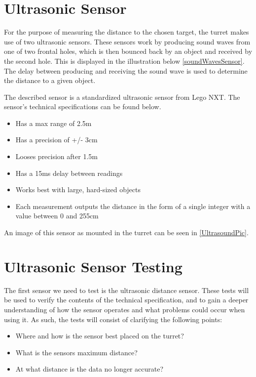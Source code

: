 \section{Ultrasonic Sensor}\label{SensTheoUltra}
For the purpose of measuring the distance to the chosen target, the turret makes
use of two ultrasonic sensors. These sensors work by producing sound waves from
one of two frontal holes, which is then bounced back by an object and received
by the second hole. This is displayed in the illustration below
\autoref{soundWavesSensor}.
The delay between producing and receiving the sound wave is used to determine the
distance to a given object. 

The described sensor is a standardized ultrasonic sensor from Lego NXT. The
sensor's technical specifications \citep{Ultrasonic_sensor} can be found below.
\begin{itemize}
  \item Has a max range of 2.5m
  \item Has a precision of +/- 3cm
  \item Looses precision after 1.5m
  \item Has a 15ms delay between readings
  \item Works best with large, hard-sized objects
  \item Each measurement outputs the distance in the form of a single integer
  with a value between 0 and 255cm
\end{itemize}

An image of this sensor as mounted in the turret can be seen in
\autoref{UltrasoundPic}.

\section{Ultrasonic Sensor Testing}\label{SensorTest}
The first sensor we need to test is the ultrasonic distance sensor. These tests
will be used to verify the contents of the technical specification, and
to gain a deeper understanding of how the sensor operates and what
problems could occur when using it. As such, the tests will consist of
clarifying the following points:
\begin{itemize}
  \item Where and how is the sensor best placed on the turret?
  \item What is the sensors maximum distance?
  \item At what distance is the data no longer accurate?
\end{itemize}

